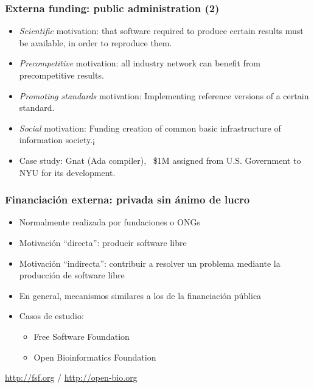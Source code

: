 
\begin{frame}
\frametitle{Externa funding: public administration (2)}

\begin{itemize}
\item \textit{Scientific} motivation: that software required to produce certain
results must be available, in order to reproduce them.
\item \textit{Precompetitive} motivation: all industry network can benefit from
precompetitive results.
\item \textit{Promoting standards} motivation: Implementing reference versions of a certain standard.
\item \textit{Social} motivation: Funding creation of common basic infrastructure of information society.¡
\item Case study: Gnat (Ada compiler), ~\$1M assigned from U.S. Government to NYU for its development.
\end{itemize}

\end{frame}


\begin{frame}
\frametitle{Financiación externa: privada sin ánimo de lucro}

\begin{itemize}
\item Normalmente realizada por fundaciones o ONGs
\item Motivación ``directa'': producir software libre
\item Motivación ``indirecta'': contribuir a resolver un problema
  mediante la producción de software libre
\item En general, mecanismos similares a los de la financiación
  pública
\item Casos de estudio: 
  \begin{itemize}
  \item Free Software Foundation
  \item Open Bioinformatics Foundation
  \end{itemize}
\end{itemize}

\begin{flushright}
\url{http://fsf.org} / \url{http://open-bio.org}
\end{flushright}
\end{frame}

